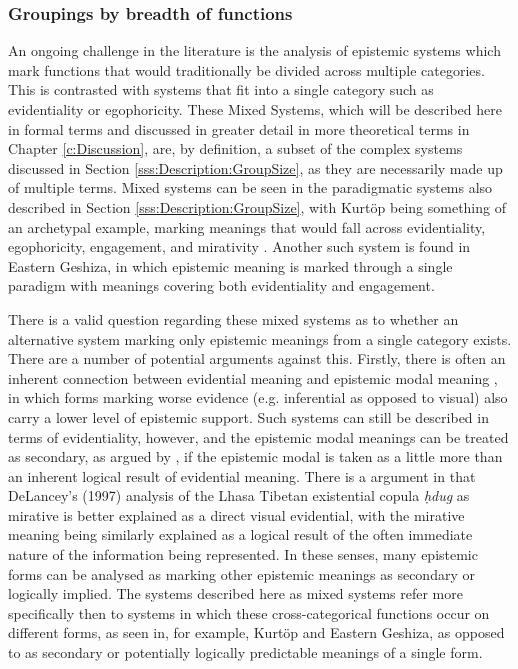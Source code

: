 \subsubsection{Groupings by breadth of functions}\label{sss:Description:MixedSystems}
An ongoing challenge in the literature is the analysis of epistemic systems which mark functions that would traditionally be divided across multiple categories. This is contrasted with systems that fit into a single category such as evidentiality or egophoricity. These Mixed Systems, which will be described here in formal terms and discussed in greater detail in more theoretical terms in Chapter \ref{c:Discussion}, are, by definition, a subset of the complex systems discussed in Section \ref{sss:Description:GroupSize}, as they are necessarily made up of multiple terms. Mixed systems can be seen in the paradigmatic systems also described in Section \ref{sss:Description:GroupSize}, with Kurtöp being something of an archetypal example, marking meanings that would fall across evidentiality, egophoricity, engagement, and mirativity \cite{Hyslop2020Kurtop}. Another such system is found in Eastern Geshiza, in which epistemic meaning is marked through a single paradigm with meanings covering both evidentiality and engagement. 

There is a valid question regarding these mixed systems as to whether an alternative system marking only epistemic meanings from a single category exists. There are a number of potential arguments against this. Firstly, there is often an inherent connection between evidential meaning and epistemic modal meaning \cite{Boye2012}, in which forms marking worse evidence (e.g. inferential as opposed to visual) also carry a lower level of epistemic support. Such systems can still be described in terms of evidentiality, however, and the epistemic modal meanings can be treated as secondary, as argued by , if the epistemic modal is taken as a little more than an inherent logical result of evidential meaning. There is a argument in  that DeLancey's (1997) analysis of the Lhasa Tibetan existential copula \textit{ḥdug} as mirative is better explained as a direct visual evidential, with the mirative meaning being similarly explained as a logical result of the often immediate nature of the information being represented. In these senses, many epistemic forms can be analysed as marking other epistemic meanings as secondary or logically implied. The systems described here as mixed systems refer more specifically then to systems in which these cross-categorical functions occur on different forms, as seen in, for example, Kurtöp and Eastern Geshiza, as opposed to as secondary or potentially logically predictable meanings of a single form.

